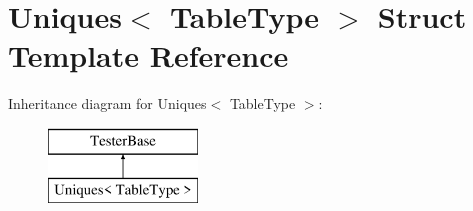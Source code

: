 \hypertarget{structUniques}{}\section{Uniques$<$ Table\+Type $>$ Struct Template Reference}
\label{structUniques}
Inheritance diagram for Uniques$<$ Table\+Type $>$\+:\begin{figure}[H]
\begin{center}
\leavevmode
\includegraphics[height=2.000000cm]{structUniques}
\end{center}
\end{figure}
